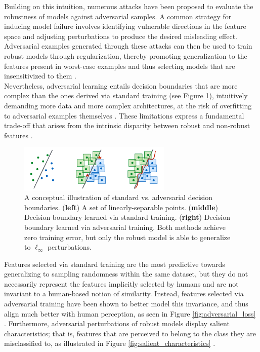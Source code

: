 Building on this intuition, numerous attacks have been proposed to evaluate the 
robustness of models against adversarial samples. A common strategy for inducing model 
failure involves identifying vulnerable directions in the feature space and adjusting 
perturbations to produce the desired misleading effect. Adversarial examples 
generated through these attacks can then be used to train robust models through 
regularization, thereby promoting generalization to the features present in 
worst-case examples and thus selecting models that are insensitivized
to them
\cite{baiRecentAdvancesAdversarial2021}.\\

Nevertheless, adversarial learning entails decision boundaries 
that are more complex than the ones derived via standard training
(see Figure \ref{fig:adversarial_complexity}), 
intuitively demanding more data and more complex 
architectures, at the risk of
overfitting to adversarial examples themselves
\cite{schmidtAdversariallyRobustGeneralization2018}. 
These limitations express a fundamental trade-off 
that arises from the intrinsic 
disparity between robust and non-robust features
\cite{tsiprasRobustnessMayBe2019, zhangTheoreticallyPrincipledTradeoff2019}. \\

\begin{figure}
    \centering
    \includegraphics[width=0.65\textwidth]{img/introduction/adversarial_complexity.png}
    \caption{
    A conceptual illustration of standard vs. adversarial 
    decision boundaries. (\textbf{left}) A set of linearly-separable points. 
    (\textbf{middle}) Decision boundary learned via standard training.
    (\textbf{right}) Decision boundary learned via adversarial training.
    Both methods achieve zero training error, but only the robust model
    is able to generalize to $\ell_\infty$ perturbations.
    \cite{madryDeepLearningModels2019}
    }
    \label{fig:adversarial_complexity}
\end{figure}

Features selected via standard training
are the most predictive towards generalizing
to sampling randomness within the same dataset, but they do
not necessarily represent the features implicitly selected 
by humans and are not invariant to a human-based notion 
of similarity. Instead, features selected via adversarial training 
have been shown to better model this
invariance, and thus align much better with 
human perception, as seen in Figure \ref{fig:adversarial_loss}
\cite{ilyasAdversarialExamplesAre2019}. Furthermore, adversarial perturbations of robust 
models display salient characteristics;
that is, features that are perceived to belong to the
class they are misclassified to, as illustrated in Figure \ref{fig:salient_characteristics}
\cite{tsiprasRobustnessMayBe2019}. \\

